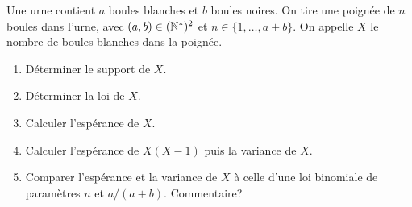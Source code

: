 \documentclass{book}
\begin{document}
\begin{Exercice}

Une urne contient $a$ boules blanches et $b$ boules noires.
On tire une poignée de $n$ boules dans l'urne, avec $(a,b) \in(\mathbb{N}^*)^2$ et $n \in\{1,\dots,a+b\}$.
On appelle $X$ le nombre de boules blanches dans la poignée.
\begin{enumerate}
\item
  Déterminer le support de $X$.
\item
  Déterminer la loi de $X$.
\item
  Calculer l'espérance de $X$.
\item
  Calculer l'espérance de $X(X-1)$ puis la variance de $X$.
\item
  Comparer l'espérance et la variance de $X$ à celle d'une loi binomiale de paramètres
  $n$ et $a/(a+b)$. Commentaire?
\end{enumerate}
\end{Exercice}
\end{document}
